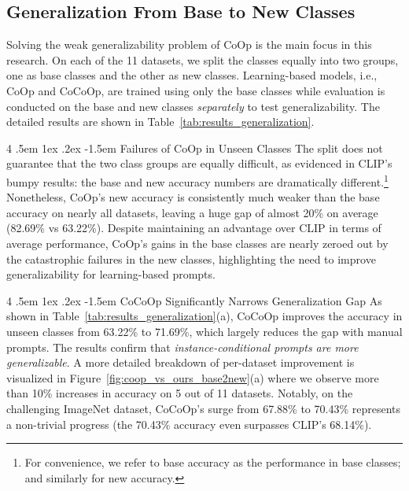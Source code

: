 \documentclass[10pt,twocolumn,letterpaper]{article}
\makeatletter
\renewcommand\paragraph{
  \@startsection{paragraph} {4} {\z@} {.5em \@plus1ex \@minus.2ex} {-1.5em} {\normalfont\normalsize\bfseries} }
\makeatother
\begin{document}
\subsection{Generalization From Base to New Classes}
\label{sec:experiments;subsec:base2new}

Solving the weak generalizability problem of CoOp is the main focus in this research. On each of the 11 datasets, we split the classes equally into two groups, one as base classes and the other as new classes. Learning-based models, i.e., CoOp and CoCoOp, are trained using only the base classes while evaluation is conducted on the base and new classes \emph{separately} to test generalizability. The detailed results are shown in Table~\ref{tab:results_generalization}.


\paragraph{Failures of CoOp in Unseen Classes}
The split does not guarantee that the two class groups are equally difficult, as evidenced in CLIP's bumpy results: the base and new accuracy numbers are dramatically different.\footnote{For convenience, we refer to base accuracy as the performance in base classes; and similarly for new accuracy.} Nonetheless, CoOp's new accuracy is consistently much weaker than the base accuracy on nearly all datasets, leaving a huge gap of almost 20\% on average (82.69\% vs 63.22\%). Despite maintaining an advantage over CLIP in terms of average performance, CoOp's gains in the base classes are nearly zeroed out by the catastrophic failures in the new classes, highlighting the need to improve generalizability for learning-based prompts.

\paragraph{CoCoOp Significantly Narrows Generalization Gap}
As shown in Table~\ref{tab:results_generalization}(a), CoCoOp improves the accuracy in unseen classes from 63.22\% to 71.69\%, which largely reduces the gap with manual prompts. The results confirm that \emph{instance-conditional prompts are more generalizable}. A more detailed breakdown of per-dataset improvement is visualized in Figure~\ref{fig:coop_vs_ours_base2new}(a) where we observe more than 10\% increases in accuracy on 5 out of 11 datasets. Notably, on the challenging ImageNet dataset, CoCoOp's surge from 67.88\% to 70.43\% represents a non-trivial progress (the 70.43\% accuracy even surpasses CLIP's 68.14\%).
\end{document}
